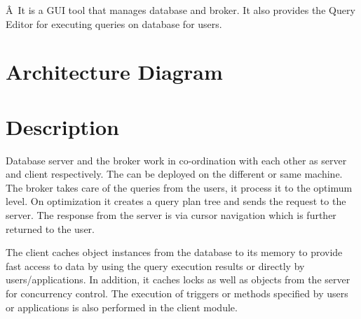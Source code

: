 \documentclass[9pt,twocolumn,twoside]{styles/osajnl}
\begin{document}
Â It is a GUI tool that manages database and broker. It also provides
the Query Editor for executing queries on database for users.

\section{Architecture Diagram}

\begin{figure}[htbp]
\centering
{}
\caption{\cite{www-cubrid.org}}
\label{Reference:false-color}
\end{figure}

\newpage

\section{Description}

Database server and the broker work in co-ordination with each other
as server and client respectively. The can be deployed on the
different or same machine. The broker takes care of the queries from
the users, it process it to the optimum level. On optimization it
creates a query plan tree and sends the request to the server. The
response from the server is via cursor navigation which is further
returned to the user.

The client caches object instances from the
database to its memory to provide fast access to data by using the
query execution results or directly by users/applications. In
addition, it caches locks as well as objects from the server for
concurrency control. The execution of triggers or methods specified by
users or applications is also performed in the client module.
\end{document}

